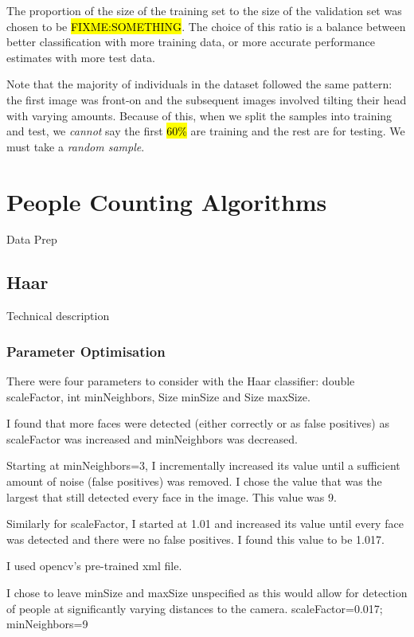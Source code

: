 \documentclass{article}
\begin{document}
The proportion of the size of the training set to the size of the validation set was chosen to be \hl{FIXME:SOMETHING}. The choice of this ratio is a balance between better classification with more training data, or more accurate performance estimates with more test data.

Note that the majority of individuals in the dataset followed the same pattern: the first image was front-on and the subsequent images involved tilting their head with varying amounts. Because of this, when we split the samples into training and test, we \textit{cannot} say the first \hl{60\%} are training and the rest are for testing. We must take a \textit{random sample}.



\section{People Counting Algorithms}
Data Prep

\subsection{Haar}
Technical description
\subsubsection{Parameter Optimisation}
There were four parameters to consider with the Haar classifier: double scaleFactor, int minNeighbors, Size minSize and Size maxSize.

I found that more faces were detected (either correctly or as false positives) as scaleFactor was increased and minNeighbors was decreased.

Starting at minNeighbors=3, I incrementally increased its value until a sufficient amount of noise (false positives) was removed. I chose the value that was the largest that still detected every face in the image. This value was 9.

Similarly for scaleFactor, I started at 1.01 and increased its value until every face was detected and there were no false positives. I found this value to be 1.017. 

I used opencv's pre-trained xml file.

I chose to leave minSize and maxSize unspecified as this would allow for detection of people at significantly varying distances to the camera.
scaleFactor=0.017; minNeighbors=9
\end{document}

